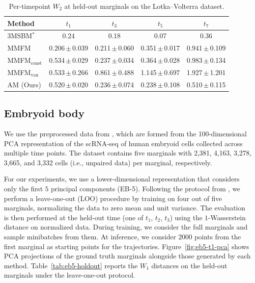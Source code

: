 \documentclass[12pt]{article}
\theoremstyle{plain}
\theoremstyle{plain}
\theoremstyle{remark}
\newcommand{\1}{\bm{1}}
\providecommand{\wentry}[2]{#1\,{\color{stdgray}$\pm$\,#2}}
\theoremstyle{plain}
\theoremstyle{definition}
\theoremstyle{remark}
\begin{document}
\begin{table}[t]
\centering
\caption{Per-timepoint $W_2$ at held-out marginals on the Lotka--Volterra dataset.}
\label{tab:lv-eval-marginals}
\begin{tabular}{lcccc}
Method & $t_1$ & $t_3$ & $t_5$ & $t_7$ \\
\midrule
3MSBM$^*$ & 0.24 & 0.18 & 0.07 & 0.36 \\
\midrule
MMFM & \wentry{0.206}{0.039} & \wentry{0.211}{0.060} & \wentry{0.351}{0.017} & \wentry{0.941}{0.109} \\
MMFM$_{\mathrm{const}}$ & \wentry{0.534}{0.029} & \wentry{0.237}{0.034} & \wentry{0.364}{0.028} & \wentry{0.983}{0.134} \\
MMFM$_{\mathrm{van}}$ & \wentry{0.533}{0.266} & \wentry{0.861}{0.488} & \wentry{1.145}{0.697} & \wentry{1.927}{1.201} \\
\midrule
AM (Ours) & \wentry{0.520}{0.020} & \wentry{0.236}{0.074} & \wentry{0.238}{0.108} & \wentry{0.510}{0.115} \\
\end{tabular}
\end{table}



























\subsection{Embryoid body}\label{app:eb}
We use the preprocessed data from \cite{moon2019eb}, which are formed from the 100-dimensional PCA representation of the scRNA-seq of human embryoid cells collected across multiple time points. The dataset contains five marginals with 2,381, 4,163, 3,278, 3,665, and 3,332 cells (i.e., unpaired data) per marginal, respectively.

For our experiments, we use a lower-dimensional representation that considers only the first $5$ principal components (EB-5). Following the protocol from \cite{tong2020trajectorynet}, we perform a leave-one-out (LOO) procedure by training on four out of five marginals, normalizing the data to zero mean and unit variance. The evaluation is then performed at the held-out time (one of $t_1$, $t_2$, $t_3$) using the $1$-Wasserstein distance on normalized data. During training, we consider the full marginals and sample minibatches from them. At inference, we consider $2000$ points from the first marginal as starting points for the trajectories. Figure~\ref{fig:eb5-t1-pca} shows PCA projections of the ground truth marginals alongside those generated by each method. Table~\ref{tab:eb5-holdout} reports the ${W}_1$ distances on the held-out marginals under the leave-one-out protocol.
\end{document}
